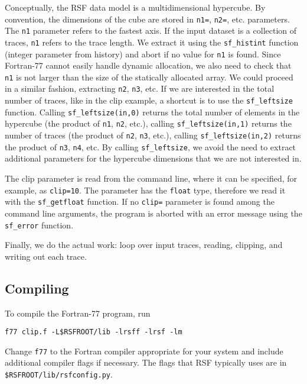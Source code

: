 
Conceptually, the RSF data model is a multidimensional hypercube. By
convention, the dimensions of the cube are stored in \texttt{n1=},
\texttt{n2=}, etc. parameters. The \texttt{n1} parameter refers to the
fastest axis. If the input dataset is a collection of traces,
\texttt{n1} refers to the trace length. We extract it using the
\texttt{sf\_histint} function (integer parameter from history) and
abort if no value for \texttt{n1} is found. Since Fortran-77 cannot
easily handle dynamic allocation, we also need to check that
\texttt{n1} is not larger than the size of the statically allocated
array. We could proceed in a similar fashion, extracting \texttt{n2},
\texttt{n3}, etc. If we are interested in the total number of traces,
like in the clip example, a shortcut is to use the
\texttt{sf\_leftsize} function.  Calling \texttt{sf\_leftsize(in,0)}
returns the total number of elements in the hypercube (the product of
\texttt{n1}, \texttt{n2}, etc.), calling \texttt{sf\_leftsize(in,1)}
returns the number of traces (the product of \texttt{n2}, \texttt{n3},
etc.), calling \texttt{sf\_leftsize(in,2)} returns the product of
\texttt{n3}, \texttt{n4}, etc. By calling \texttt{sf\_leftsize}, we
avoid the need to extract additional parameters for the hypercube
dimensions that we are not interested in.


The clip parameter is read from the command line, where it can be
specified, for example, as \texttt{clip=10}. The parameter has the
\texttt{float} type, therefore we read it with the
\texttt{sf\_getfloat} function. If no \texttt{clip=} parameter is
found among the command line arguments, the program is aborted with an
error message using the \texttt{sf\_error} function.


Finally, we do the actual work: loop over input traces, reading,
clipping, and writing out each trace.

\subsection{Compiling}

To compile the Fortran-77 program, run
\begin{verbatim}
f77 clip.f -L$RSFROOT/lib -lrsff -lrsf -lm
\end{verbatim}
Change \texttt{f77} to the Fortran compiler appropriate for your system and
include additional compiler flags if necessary. The flags that RSF typically
uses are in \\ \texttt{\$RSFROOT/lib/rsfconfig.py}.

